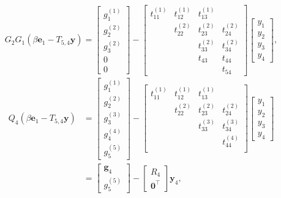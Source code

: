 \[G_2G_1(\beta\bm e_1-T_{5,4}\bm y)=\begin{bmatrix}g_1^{(1)}\\g_2^{(2)}\\g_3^{(2)}\\0\\0\end{bmatrix}
-\begin{bmatrix}t_{11}^{(1)}&t_{12}^{(1)}&t_{13}^{(1)}&\\&t_{22}^{(2)}&t_{23}^{(2)}&t_{24}^{(2)}\\&&t_{33}^{(2)}&t_{34}^{(2)}\\&&t_{43}&t_{44}\\&&&t_{54}\end{bmatrix}\begin{bmatrix}y_1\\y_2\\y_3\\y_4\end{bmatrix},\]
\[\begin{aligned}
Q_4(\beta\bm e_1-T_{5,4}\bm y)&=\begin{bmatrix}g_1^{(1)}\\g_2^{(2)}\\g_3^{(3)}\\g_4^{(4)}\\g_5^{(5)}\end{bmatrix}
-\begin{bmatrix}t_{11}^{(1)}&t_{12}^{(1)}&t_{13}^{(1)}&\\&t_{22}^{(2)}&t_{23}^{(2)}&t_{24}^{(2)}\\&&t_{33}^{(3)}&t_{34}^{(3)}\\&&&t_{44}^{(4)}\\&&&\end{bmatrix}\begin{bmatrix}y_1\\y_2\\y_3\\y_4\end{bmatrix}\\
&=\begin{bmatrix}\bm g_4\\g_5^{(5)}\end{bmatrix}-\begin{bmatrix}R_4\\\bm0^{\top}\end{bmatrix}\bm y_4,
\end{aligned}\]

